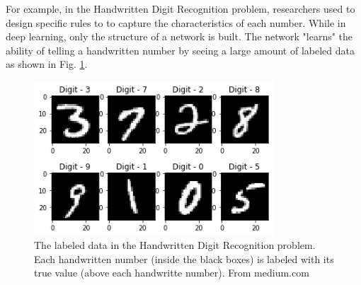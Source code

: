 For example, in the Handwritten Digit Recognition problem, researchers used to design specific rules to to capture the characteristics of each number. While in deep learning, only the structure of a network is built. The network "learns" the ability of telling a handwritten number by seeing a large amount of labeled data as shown in Fig. \ref{fig_dig_rec}.
\begin{figure}[!h]
\begin{center}
\includegraphics[width = 9cm]{img/digit_recog.png}
\caption[The labeled data in the Handwritten Digit Recognition problem]{The labeled data in the Handwritten Digit Recognition problem. Each handwritten number (inside the black boxes) is labeled with its true value (above each handwritte number). From medium.com \label{fig_dig_rec}}
\end{center}
\end{figure}

